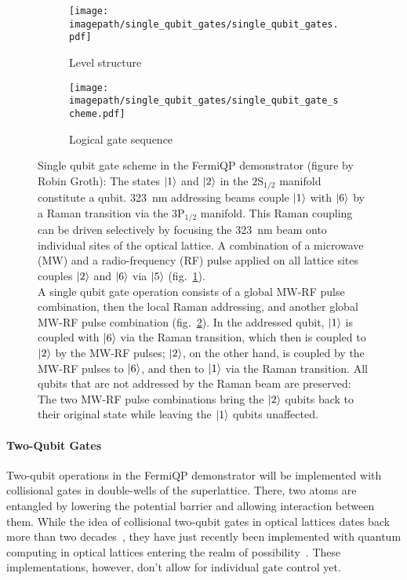 \begin{figure}
    \centering
    \hspace{2.2cm}
    \begin{subfigure}[t]{0.25\textwidth}
        \centering
        \texttt{[image: \\imagepath/single\_qubit\_gates/single\_qubit\_gates.pdf]}
        \caption{Level structure}
        \label{fig:single_qubit_gates_levels}
    \end{subfigure}
    \begin{subfigure}[t]{0.55\textwidth}
        \centering
        \texttt{[image: \\imagepath/single\_qubit\_gates/single\_qubit\_gate\_scheme.pdf]}
        \caption{Logical gate sequence}
        \label{fig:single_qubit_gate_scheme}
    \end{subfigure}
    
    \caption{Single qubit gate scheme in the FermiQP demonstrator (figure by Robin Groth): The states $\Ket{1}$ and $\Ket{2}$ in the $2\text{S}_{1/2}$ manifold constitute a qubit.
    \SI[]{323}{\nano\meter} addressing beams couple $\Ket{1}$ with $\Ket{6}$ by a Raman transition via the $3\text{P}_{1/2}$ manifold. This Raman coupling can be driven selectively by focusing the \SI[]{323}{\nano\meter} beam onto individual sites of the optical lattice.
    A combination of a microwave (MW) and a radio-frequency (RF) pulse applied on all lattice sites couples $\Ket{2}$ and $\Ket{6}$ via $\Ket{5}$ (fig.~\ref{fig:single_qubit_gates_levels}).\\
    A single qubit gate operation consists of a global MW-RF pulse combination, then the local Raman addressing, and another global MW-RF pulse combination (fig.~\ref{fig:single_qubit_gate_scheme}).
    In the addressed qubit, $\Ket{1}$ is coupled with $\Ket{6}$ via the Raman transition, which then is coupled to $\Ket{2}$ by the MW-RF pulses; $\Ket{2}$, on the other hand, is coupled by the MW-RF pulses to $\Ket{6}$, and then to $\Ket{1}$ via the Raman transition.
    All qubits that are not addressed by the Raman beam are preserved: The two MW-RF pulse combinations bring the $\Ket{2}$ qubits back to their original state while leaving the $\Ket{1}$ qubits unaffected.}
    \label{fig:single_qubit_gates}
\end{figure}

\paragraph*{Two-Qubit Gates}
Two-qubit operations in the FermiQP demonstrator will be implemented with collisional gates in double-wells of the superlattice. There, two atoms are entangled by lowering the potential barrier and allowing interaction between them. While the idea of collisional two-qubit gates in optical lattices dates back more than two decades~\cite{jaksch_fast_2000, anderlini_controlled_2006,trotzky_time-resolved_2008}, they have just recently been implemented with quantum computing in optical lattices entering the realm of possibility~\cite{dai_generation_2016, yang_cooling_2020, zhang_functional_2022}. These implementations, however, don't allow for individual gate control yet.

